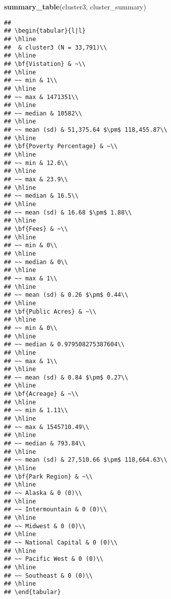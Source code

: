 \documentclass[
]{article}
\newenvironment{Shaded}{\begin{snugshade}}{\end{snugshade}}
\newcommand{\KeywordTok}[1]{\textcolor[rgb]{0.13,0.29,0.53}{\textbf{#1}}}
\newcommand{\NormalTok}[1]{#1}
\begin{document}
\begin{Shaded}
\begin{Highlighting}[]
\KeywordTok{summary_table}\NormalTok{(cluster3, cluster_summary)}
\end{Highlighting}
\end{Shaded}

\begin{verbatim}
## 
## \begin{tabular}{l|l}
## \hline
##  & cluster3 (N = 33,791)\\
## \hline
## \bf{Vistation} & ~\\
## \hline
## ~~ min & 1\\
## \hline
## ~~ max & 1471351\\
## \hline
## ~~ median & 10582\\
## \hline
## ~~ mean (sd) & 51,375.64 $\pm$ 118,455.87\\
## \hline
## \bf{Poverty Percentage} & ~\\
## \hline
## ~~ min & 12.6\\
## \hline
## ~~ max & 23.9\\
## \hline
## ~~ median & 16.5\\
## \hline
## ~~ mean (sd) & 16.68 $\pm$ 1.88\\
## \hline
## \bf{Fees} & ~\\
## \hline
## ~~ min & 0\\
## \hline
## ~~ median & 0\\
## \hline
## ~~ max & 1\\
## \hline
## ~~ mean (sd) & 0.26 $\pm$ 0.44\\
## \hline
## \bf{Public Acres} & ~\\
## \hline
## ~~ min & 0\\
## \hline
## ~~ median & 0.979508275387604\\
## \hline
## ~~ max & 1\\
## \hline
## ~~ mean (sd) & 0.84 $\pm$ 0.27\\
## \hline
## \bf{Acreage} & ~\\
## \hline
## ~~ min & 1.11\\
## \hline
## ~~ max & 1545710.49\\
## \hline
## ~~ median & 793.84\\
## \hline
## ~~ mean (sd) & 27,510.66 $\pm$ 118,664.63\\
## \hline
## \bf{Park Region} & ~\\
## \hline
## ~~ Alaska & 0 (0)\\
## \hline
## ~~ Intermountain & 0 (0)\\
## \hline
## ~~ Midwest & 0 (0)\\
## \hline
## ~~ National Capital & 0 (0)\\
## \hline
## ~~ Pacific West & 0 (0)\\
## \hline
## ~~ Southeast & 0 (0)\\
## \hline
## \end{tabular}
\end{verbatim}
\end{document}
